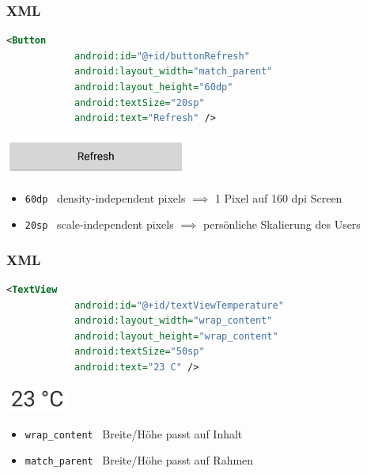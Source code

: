 \begin{frame}[fragile]
	\frametitle{XML}
	\vspace{-2mm}
	\begin{lstlisting}[language=XML]
		<Button
		    android:id="@+id/buttonRefresh"
		    android:layout_width="match_parent"
		    android:layout_height="60dp"
		    android:textSize="20sp"
		    android:text="Refresh" />
     \end{lstlisting}
     \pause
     \vspace{-9mm}
     \begin{center}
     	\includegraphics[width=6cm]{pictures/buttonRefresh.png}
     \end{center}
     \pause
     \vspace{-5mm}
     \begin{itemize}
     	\item \verb|60dp| \textrightarrow \ density-independent pixels \newline
     	\quad \( \implies \) 1 Pixel auf 160 dpi Screen \pause
     	\vspace{2mm}
     	\item \verb|20sp| \textrightarrow \ scale-independent pixels \newline
     	\quad \( \implies \) persönliche Skalierung des Users
     \end{itemize}
\end{frame}

\begin{frame}[fragile]
	\frametitle{XML}
	\vspace{-2mm}
	\begin{lstlisting}[language=XML]
		<TextView
		    android:id="@+id/textViewTemperature"
		    android:layout_width="wrap_content"
		    android:layout_height="wrap_content"
		    android:textSize="50sp"
		    android:text="23 C" />
     \end{lstlisting}
     \pause
     \vspace{-9mm}
     \begin{center}
     	\includegraphics[width=2cm]{pictures/textViewTemperature.png}
     \end{center}
     \pause
     \vspace{-5mm}
     \begin{itemize}
     	\item \verb|wrap_content| \textrightarrow \ Breite/Höhe passt auf Inhalt \pause
     	\vspace{2mm}
     	\item \verb|match_parent| \textrightarrow \ Breite/Höhe passt auf Rahmen
     \end{itemize}
\end{frame}

